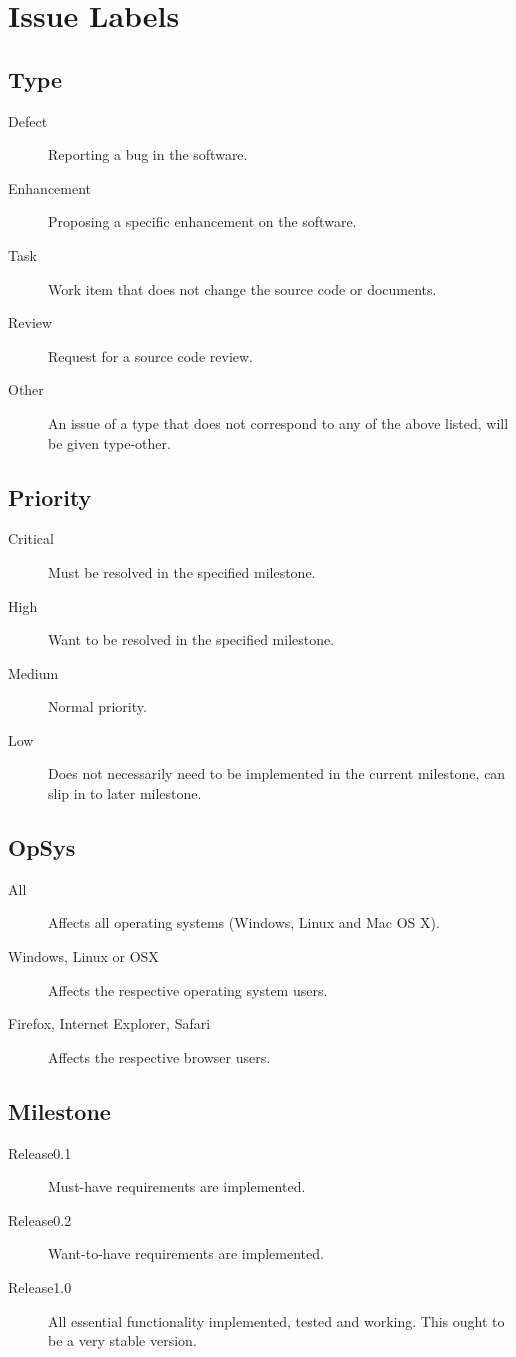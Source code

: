\documentclass{report}
\begin{document}
\section{Issue Labels}

\subsection{Type}
\begin{description}
\item[Defect]
Reporting a bug in the software.
\item[Enhancement]
Proposing a specific enhancement on the software.
\item[Task]
Work item that does not change the source code or documents.
\item[Review]
Request for a source code review.
\item[Other]
An issue of a type that does not correspond to any of the above listed, will be given type-other.
\end{description}
\subsection{Priority}
\begin{description}
\item[Critical]
Must be resolved in the specified milestone.
\item[High]
Want to be resolved in the specified milestone.
\item[Medium]
Normal priority.
\item[Low]
Does not necessarily need to be implemented in the current milestone, can slip in to later milestone.
\end{description}
\subsection{OpSys}
\begin{description}
\item[All]
Affects all operating systems (Windows, Linux and Mac OS X).
\item[Windows, Linux or OSX]
Affects the respective operating system users.
\item[Firefox, Internet Explorer, Safari]
Affects the respective browser users.
\end{description}
\subsection{Milestone}
\begin{description}
\item[Release0.1]
Must-have requirements are implemented.
\item[Release0.2]
Want-to-have requirements are implemented.
\item[Release1.0]
All essential functionality implemented, tested and working. This ought to be a very stable version.
\end{description}
\end{document}
